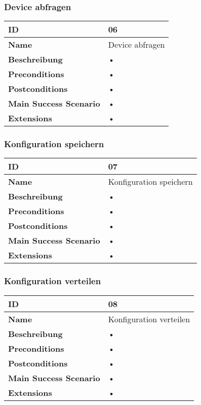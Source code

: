 \subsubsection{Device abfragen}
\mbox{}
\begin{longtable}{| p{4cm} | p{11.7cm} |}
 \hline
 \textbf{ID} & 06\\ \hline 
 \textbf{Name} & Device abfragen\\ \hline 
 \textbf{Beschreibung} & • \\ \hline 
 \textbf{Preconditions} & • \\ \hline 
 \textbf{Postconditions} & • \\ \hline 
 \textbf{Main Success Scenario} & • \\ \hline 
 \textbf{Extensions} & • \\ \hline 
 \end{longtable}
 
\subsubsection{Konfiguration speichern}
\mbox{}
\begin{longtable}{| p{4cm} | p{11.7cm} |}
 \hline
 \textbf{ID} & 07\\ \hline 
 \textbf{Name} & Konfiguration speichern\\ \hline 
 \textbf{Beschreibung} & • \\ \hline 
 \textbf{Preconditions} & • \\ \hline 
 \textbf{Postconditions} & • \\ \hline 
 \textbf{Main Success Scenario} & • \\ \hline 
 \textbf{Extensions} & • \\ \hline 
 \end{longtable}
 
\subsubsection{Konfiguration verteilen}
\mbox{}
\begin{longtable}{| p{4cm} | p{11.7cm} |}
 \hline
 \textbf{ID} & 08\\ \hline 
 \textbf{Name} & Konfiguration verteilen\\ \hline 
 \textbf{Beschreibung} & • \\ \hline 
 \textbf{Preconditions} & • \\ \hline 
 \textbf{Postconditions} & • \\ \hline 
 \textbf{Main Success Scenario} & • \\ \hline 
 \textbf{Extensions} & • \\ \hline 
 \end{longtable}
 
